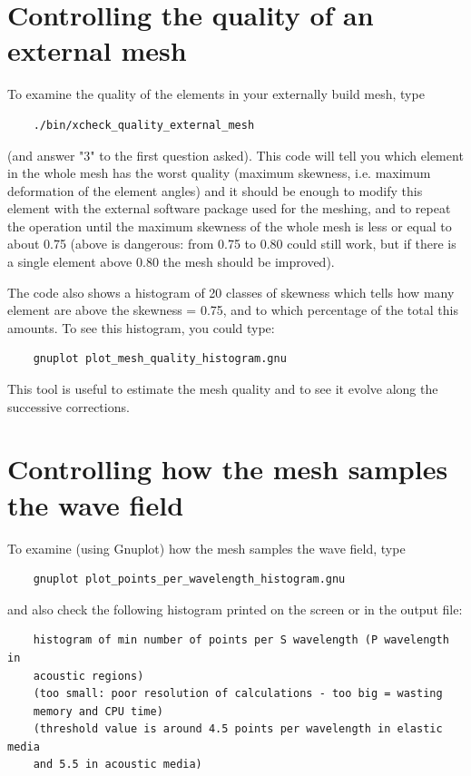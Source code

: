 \documentclass[oneside,english,onecolumn,letterpaper]{book}
\begin{document}
\section{Controlling the quality of an external mesh}

To examine the quality of the elements in your externally build mesh, type
%
\begin{verbatim}
    ./bin/xcheck_quality_external_mesh
\end{verbatim}
%
(and answer "3" to the first question asked).
This code will tell you which element in the whole mesh has the worst quality (maximum skewness, i.e. maximum deformation of the element angles) and it should be enough to modify this element with the external software package used for the meshing, and
to repeat the operation until the maximum skewness of the whole mesh is less or equal to about 0.75 (above is dangerous: from 0.75 to 0.80 could still work, but if there is a single element above 0.80 the mesh should be improved).

The code also shows a histogram of 20 classes of skewness which tells how many element are above the skewness = 0.75, and to which percentage of the total this amounts. To see this histogram, you could type:
%
\begin{verbatim}
    gnuplot plot_mesh_quality_histogram.gnu
\end{verbatim}
%
This tool is useful to estimate the mesh quality and to see it evolve along the successive corrections.

\section{Controlling how the mesh samples the wave field}

To examine (using Gnuplot) how the mesh samples the wave field, type
%
\begin{verbatim}
    gnuplot plot_points_per_wavelength_histogram.gnu
\end{verbatim}
%
and also check the following histogram printed on the screen or in the output file:
%
\begin{verbatim}
    histogram of min number of points per S wavelength (P wavelength in
    acoustic regions)
    (too small: poor resolution of calculations - too big = wasting
    memory and CPU time)
    (threshold value is around 4.5 points per wavelength in elastic media
    and 5.5 in acoustic media)
\end{verbatim}
\end{document}
